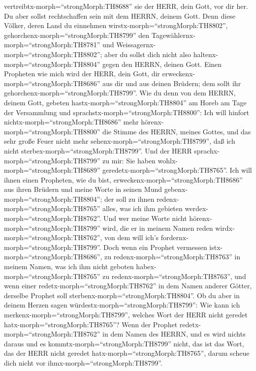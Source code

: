 vertreibtx-morph=``strongMorph:TH8688'' sie der HERR, dein Gott, vor dir
her.  Du aber sollst rechtschaffen sein mit dem HERRN,
deinem Gott.  Denn diese Völker, deren Land du einnehmen
wirstx-morph=``strongMorph:TH8802'',
gehorchenx-morph=``strongMorph:TH8799'' den
Tagewählernx-morph=``strongMorph:TH8781'' und
Weissagernx-morph=``strongMorph:TH8802''; aber du sollst dich nicht also
haltenx-morph=``strongMorph:TH8804'' gegen den HERRN, deinen Gott.
 Einen Propheten wie mich wird der HERR, dein Gott, dir
erweckenx-morph=``strongMorph:TH8686'' aus dir und aus deinen Brüdern;
dem sollt ihr gehorchenx-morph=``strongMorph:TH8799''.  Wie
du denn von dem HERRN, deinem Gott, gebeten
hastx-morph=``strongMorph:TH8804'' am Horeb am Tage der Versammlung und
sprachstx-morph=``strongMorph:TH8800'': Ich will hinfort
nichtx-morph=``strongMorph:TH8686'' mehr
hörenx-morph=``strongMorph:TH8800'' die Stimme des HERRN, meines Gottes,
und das sehr große Feuer nicht mehr sehenx-morph=``strongMorph:TH8799'',
daß ich nicht sterbex-morph=``strongMorph:TH8799''.  Und
der HERR sprachx-morph=``strongMorph:TH8799'' zu mir: Sie haben
wohlx-morph=``strongMorph:TH8689''
geredetx-morph=``strongMorph:TH8765''.  Ich will ihnen
einen Propheten, wie du bist, erweckenx-morph=``strongMorph:TH8686'' aus
ihren Brüdern und meine Worte in seinen Mund
gebenx-morph=``strongMorph:TH8804''; der soll zu ihnen
redenx-morph=``strongMorph:TH8765'' alles, was ich ihm gebieten
werdex-morph=``strongMorph:TH8762''.  Und wer meine Worte
nicht hörenx-morph=``strongMorph:TH8799'' wird, die er in meinem Namen
reden wirdx-morph=``strongMorph:TH8762'', von dem will ich's
fordernx-morph=``strongMorph:TH8799''.  Doch wenn ein
Prophet vermessen istx-morph=``strongMorph:TH8686'', zu
redenx-morph=``strongMorph:TH8763'' in meinem Namen, was ich ihm nicht
geboten habex-morph=``strongMorph:TH8765'' zu
redenx-morph=``strongMorph:TH8763'', und wenn einer
redetx-morph=``strongMorph:TH8762'' in dem Namen anderer Götter,
derselbe Prophet soll sterbenx-morph=``strongMorph:TH8804''.
 Ob du aber in deinem Herzen sagen
würdestx-morph=``strongMorph:TH8799'': Wie kann ich
merkenx-morph=``strongMorph:TH8799'', welches Wort der HERR nicht
geredet hatx-morph=``strongMorph:TH8765''?  Wenn der
Prophet redetx-morph=``strongMorph:TH8762'' in dem Namen des HERRN, und
es wird nichts daraus und es kommtx-morph=``strongMorph:TH8799'' nicht,
das ist das Wort, das der HERR nicht geredet
hatx-morph=``strongMorph:TH8765'', darum scheue dich nicht vor
ihmx-morph=``strongMorph:TH8799''.

